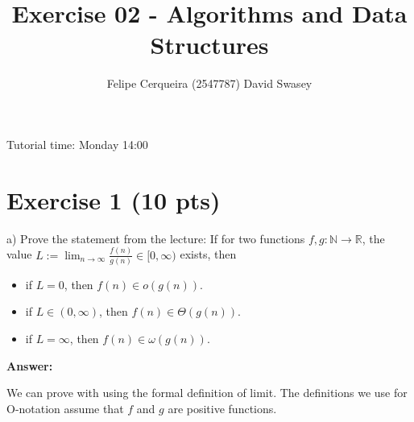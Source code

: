 \documentclass{article}
\title{Exercise 02 - Algorithms and Data Structures}
\author{Felipe Cerqueira (2547787) \quad David Swasey}
\begin{document}
\maketitle

Tutorial time: Monday 14:00

\section{Exercise 1 (10 pts)}

\noindent a) Prove the statement from the lecture: If for two functions $f, g: \mathbb{N} \rightarrow \mathbb{R}$, the value $L := \lim_{n \rightarrow \infty} \frac{f(n)}{g(n)} \in [0, \infty)$ exists, then

\begin{itemize}
\item if $L = 0$, then $f(n) \in o(g(n))$.
\item if $L \in (0, \infty)$, then $f(n) \in \Theta(g(n))$.
\item if $L = \infty$, then $f(n) \in \omega(g(n))$.
\end{itemize}

\bigskip \noindent \textbf{Answer:}

We can prove with using the formal definition of limit. The definitions we use for O-notation assume that $f$ and $g$ are positive functions.
\end{document}
